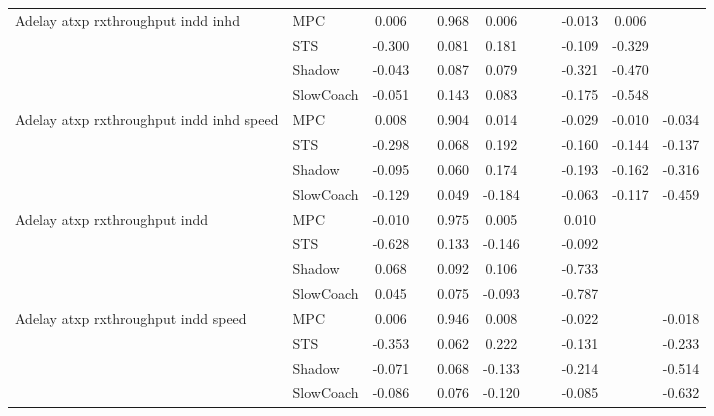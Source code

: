 \begin{tabular}{|l|l|*{9}{c|}}
\midrule
Adelay atxp rxthroughput indd inhd    & MPC &    0.006 &        &     0.968 &  0.006 &     &     &  -0.013 &   0.006 &       \\
                              & STS &   -0.300 &        &     0.081 &  0.181 &     &     &  -0.109 &  -0.329 &       \\
                              & Shadow &   -0.043 &        &     0.087 &  0.079 &     &     &  -0.321 &  -0.470 &       \\
                              & SlowCoach &   -0.051 &        &     0.143 &  0.083 &     &     &  -0.175 &  -0.548 &       \\
\midrule
Adelay atxp rxthroughput indd inhd speed    & MPC &    0.008 &        &     0.904 &  0.014 &     &     &  -0.029 &  -0.010 &   -0.034 \\
                              & STS &   -0.298 &        &     0.068 &  0.192 &     &     &  -0.160 &  -0.144 &   -0.137 \\
                              & Shadow &   -0.095 &        &     0.060 &  0.174 &     &     &  -0.193 &  -0.162 &   -0.316 \\
                              & SlowCoach &   -0.129 &        &     0.049 & -0.184 &     &     &  -0.063 &  -0.117 &   -0.459 \\
\midrule
Adelay atxp rxthroughput indd    & MPC &   -0.010 &        &     0.975 &  0.005 &     &     &   0.010 &      &       \\
                              & STS &   -0.628 &        &     0.133 & -0.146 &     &     &  -0.092 &      &       \\
                              & Shadow &    0.068 &        &     0.092 &  0.106 &     &     &  -0.733 &      &       \\
                              & SlowCoach &    0.045 &        &     0.075 & -0.093 &     &     &  -0.787 &      &       \\
\midrule
Adelay atxp rxthroughput indd speed    & MPC &    0.006 &        &     0.946 &  0.008 &     &     &  -0.022 &      &   -0.018 \\
                              & STS &   -0.353 &        &     0.062 &  0.222 &     &     &  -0.131 &      &   -0.233 \\
                              & Shadow &   -0.071 &        &     0.068 & -0.133 &     &     &  -0.214 &      &   -0.514 \\
                              & SlowCoach &   -0.086 &        &     0.076 & -0.120 &     &     &  -0.085 &      &   -0.632 \\

\end{tabular}
